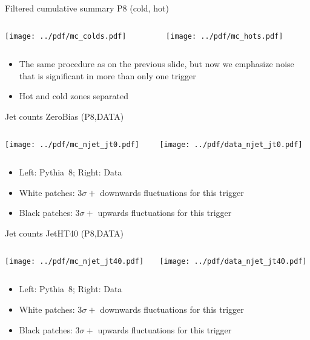 \documentclass[9pt]{beamer}
\begin{document}
\begin{frame}[t]{Filtered cumulative summary P8 (cold, hot)}
\begin{columns}[T]
  \begin{column}{.5\textwidth}
  \texttt{[image: ../pdf/mc\_colds.pdf]}
  \end{column}
  \begin{column}{.5\textwidth}
  \texttt{[image: ../pdf/mc\_hots.pdf]}
  \end{column}
\end{columns}
\begin{itemize}
 \item The same procedure as on the previous slide, but now we emphasize noise that is significant in more than only one trigger
 \item Hot and cold zones separated
\end{itemize}
\end{frame}

\begin{frame}[t]{Jet counts ZeroBias (P8,DATA)}
\begin{columns}[T]
  \begin{column}{.5\textwidth}
  \texttt{[image: ../pdf/mc\_njet\_jt0.pdf]}
  \end{column}
  \begin{column}{.5\textwidth}
  \texttt{[image: ../pdf/data\_njet\_jt0.pdf]}
  \end{column}
\end{columns}
\begin{itemize}
 \item Left: Pythia~8; Right: Data
 \item White patches: $3\sigma+$ downwards fluctuations for this trigger
 \item Black patches: $3\sigma+$ upwards fluctuations for this trigger
\end{itemize}
\end{frame}

\begin{frame}[t]{Jet counts JetHT40 (P8,DATA)}
\begin{columns}[T]
  \begin{column}{.5\textwidth}
  \texttt{[image: ../pdf/mc\_njet\_jt40.pdf]}
  \end{column}
  \begin{column}{.5\textwidth}
  \texttt{[image: ../pdf/data\_njet\_jt40.pdf]}
  \end{column}
\end{columns}
\begin{itemize}
 \item Left: Pythia~8; Right: Data
 \item White patches: $3\sigma+$ downwards fluctuations for this trigger
 \item Black patches: $3\sigma+$ upwards fluctuations for this trigger
\end{itemize}
\end{frame}
\end{document}
